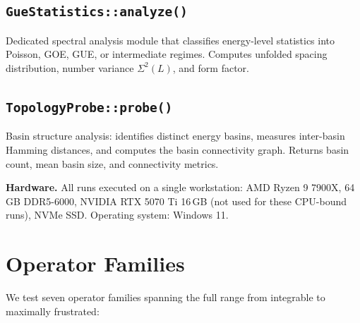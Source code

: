 \documentclass[12pt,a4paper]{article}
\theoremstyle{definition}\newtheorem{definition}[theorem]{Definition}
\theoremstyle{remark}\newtheorem{remark}[theorem]{Remark}
\begin{document}
\subsection{\texttt{GueStatistics::analyze()}}

Dedicated spectral analysis module that classifies energy-level statistics
into Poisson, GOE, GUE, or intermediate regimes. Computes unfolded
spacing distribution, number variance $\Sigma^2(L)$, and form factor.

\subsection{\texttt{TopologyProbe::probe()}}

Basin structure analysis: identifies distinct energy basins, measures
inter-basin Hamming distances, and computes the basin connectivity graph.
Returns basin count, mean basin size, and connectivity metrics.

\medskip

\noindent\textbf{Hardware.} All runs executed on a single workstation:
AMD Ryzen 9 7900X, 64\,GB DDR5-6000, NVIDIA RTX 5070 Ti 16\,GB (not
used for these CPU-bound runs), NVMe SSD. Operating system: Windows 11.

\section{Operator Families}
\label{sec:families}

We test seven operator families spanning the full range from integrable
to maximally frustrated:
\end{document}
